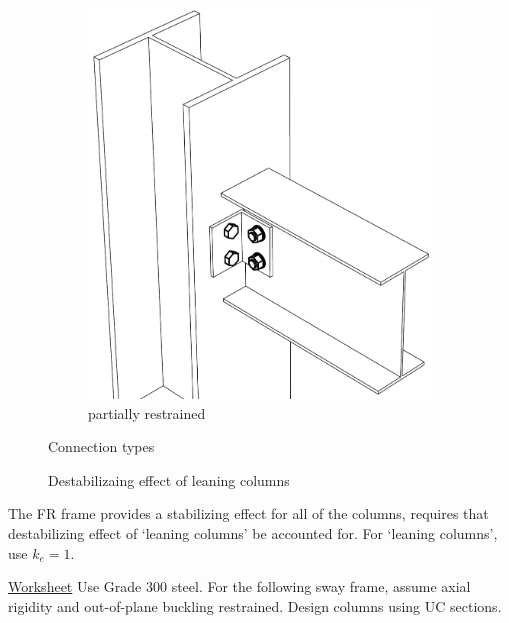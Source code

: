 \begin{figure}[H]
\begin{subfigure}{.5\linewidth}
\includegraphics[width=.9\linewidth]{PIC/CH04/PR}
\caption{partially restrained}
\end{subfigure}
\caption{Connection types}
\end{figure}
\begin{figure}[H]
\centering
\caption{Destabilizaing effect of leaning columns}
\end{figure}
The FR frame provides a stabilizing effect for all of the columns, \NZSSTEEL{} requires that destabilizing effect of `leaning columns' be accounted for. For `leaning columns', use $k_e=1$.
\begin{exmp}\href{run:./WORKSHEET/CH04/EX4.ACLC.sm}{Worksheet}
Use Grade 300 steel. For the following sway frame, assume axial rigidity and out-of-plane buckling restrained. Design columns using UC sections.
\begin{figure}[H]

\end{figure}
\end{exmp}
